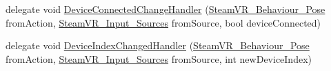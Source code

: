 \begin{DoxyCompactItemize}
\item 
delegate void \mbox{\hyperlink{class_valve_1_1_v_r_1_1_steam_v_r___behaviour___pose_abb026a5887e19143d6b95452453dc8de}{Device\+Connected\+Change\+Handler}} (\mbox{\hyperlink{class_valve_1_1_v_r_1_1_steam_v_r___behaviour___pose}{Steam\+V\+R\+\_\+\+Behaviour\+\_\+\+Pose}} from\+Action, \mbox{\hyperlink{namespace_valve_1_1_v_r_a82e5bf501cc3aa155444ee3f0662853f}{Steam\+V\+R\+\_\+\+Input\+\_\+\+Sources}} from\+Source, bool device\+Connected)
\item 
delegate void \mbox{\hyperlink{class_valve_1_1_v_r_1_1_steam_v_r___behaviour___pose_ac81003e896ac2766c36b5c7a3438ef7f}{Device\+Index\+Changed\+Handler}} (\mbox{\hyperlink{class_valve_1_1_v_r_1_1_steam_v_r___behaviour___pose}{Steam\+V\+R\+\_\+\+Behaviour\+\_\+\+Pose}} from\+Action, \mbox{\hyperlink{namespace_valve_1_1_v_r_a82e5bf501cc3aa155444ee3f0662853f}{Steam\+V\+R\+\_\+\+Input\+\_\+\+Sources}} from\+Source, int new\+Device\+Index)
\end{DoxyCompactItemize}
